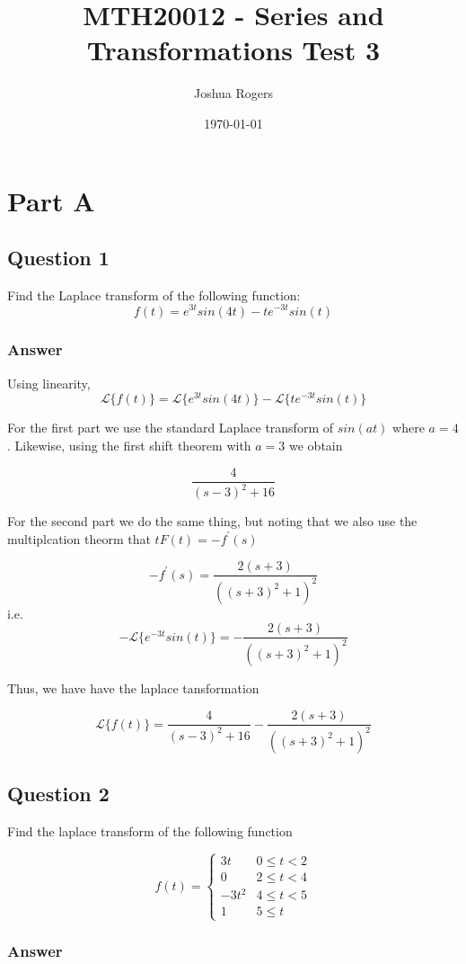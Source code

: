 \documentclass{article}
\title{\vspace{-4cm}MTH20012 - Series and Transformations Test 3}
\author{Joshua Rogers}
\date\today
\begin{document}
\maketitle 

\section*{Part A}
\subsection*{Question 1}
Find the Laplace transform of the following function:
$$f(t) = e^{3t}sin(4t)-te^{-3t}sin(t)$$
\subsubsection*{Answer}

Using linearity,
$$ \mathcal{L}\{f(t)\} = \mathcal{L}\{e^{3t} sin(4t)\} - \mathcal{L}\{t e^{-3t} sin(t)\}$$

For the first part we use the standard Laplace transform of $sin(at)$ where $a=4$. Likewise, using the first shift theorem with $a=3$ we obtain

$$\frac{4}{(s-3)^2+16}$$

For the second part we do the same thing, but noting that we also use the multiplcation theorm that $tF(t) = -f^{'}(s)$

$$-f^{'}(s) = \frac{2(s+3)}{\left((s+3)^2+1\right)^2}$$
i.e.
$$- \mathcal{L}\{e^{-3t} sin(t)\} = - \frac{2(s+3)}{\left((s+3)^2+1\right)^2}$$

Thus, we have have the laplace tansformation

$$\mathcal{L}\{f(t)\} = \frac{4}{(s-3)^2+16} - \frac{2(s+3)}{\left((s+3)^2+1\right)^2}$$

\subsection*{Question 2}
Find the laplace transform of the following function

\[ f(t) = \begin{cases}
     3t & 0\leq t < 2 \\
     0 & 2\leq t < 4 \\
     -3t^2 & 4 \leq t < 5 \\
     1 & 5 \leq t
   \end{cases}
\]

\subsubsection*{Answer}
\end{document}
